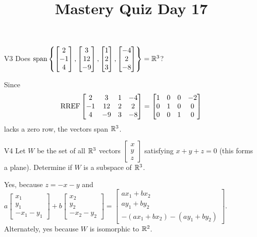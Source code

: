 \documentclass{sbgLAquiz}
\title{Mastery Quiz Day 17 }
\begin{document}
\begin{problem}{V3}
Does
\(
  \operatorname{span}\left\{
    \begin{bmatrix} 2 \\ -1 \\ 4 \end{bmatrix},
    \begin{bmatrix} 3 \\ 12 \\ -9 \end{bmatrix},
    \begin{bmatrix} 1 \\ 2 \\ 3 \end{bmatrix},
    \begin{bmatrix} -4 \\ 2 \\ -8 \end{bmatrix}
  \right\} = \mathbb{R}^3
\)?
\end{problem}
\begin{solution}
Since
\[
  \operatorname{RREF}\begin{bmatrix}
    2 & 3 & 1 & -4 \\
    -1 & 12 & 2 & 2 \\
    4 & -9 & 3 & -8
  \end{bmatrix} =
  \begin{bmatrix}
    1 & 0 & 0 & -2 \\
    0 & 1 & 0 & 0 \\
    0 & 0 & 1 & 0
  \end{bmatrix}
\]
lacks a zero row, the vectors span \(\mathbb{R}^3\).
\end{solution}

\begin{problem}{V4} Let \(W\) be the set of all \(\mathbb{R}^3\) vectors
\(\begin{bmatrix} x \\ y \\ z \end{bmatrix}\) satisfying \(x+y+z=0\) (this forms a plane).
Determine if \(W\) is a subspace of \(\mathbb{R}^3\).
\end{problem}
\begin{solution}
Yes, because \(z=-x-y\) and
\(
  a\begin{bmatrix} x_1 \\ y_1 \\ -x_1-y_1 \end{bmatrix}+
  b\begin{bmatrix} x_2 \\ y_2 \\ -x_2-y_2 \end{bmatrix}=
  \begin{bmatrix}
    ax_1+bx_2 \\
    ay_1+by_2 \\
    -(ax_1+bx_2)-(ay_1+by_2)
  \end{bmatrix}
\).
Alternately, yes because \(W\) is isomorphic to \(\mathbb{R}^2\).
\end{solution}
\end{document}
